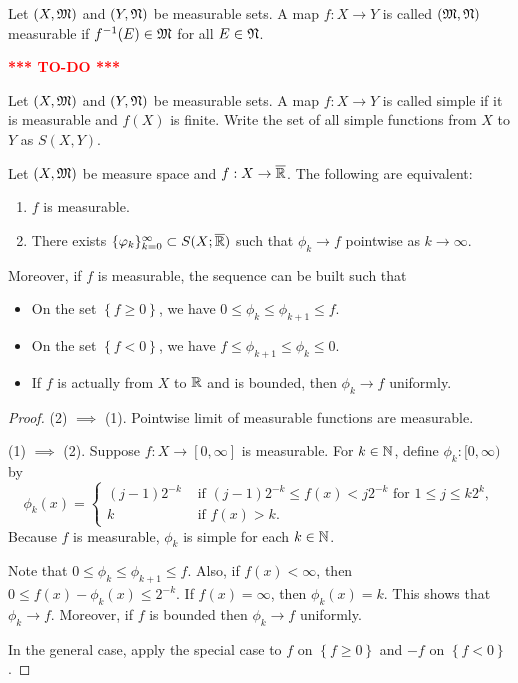 \documentclass[a4paper]{article}
\newcommand{\TODO}{\textcolor{red}{\textbf{*** TO-DO ***}}}
\begin{document}
\begin{defi}
  Let $(X, \mathfrak{M})$ and $(Y, \mathfrak{N})$ be measurable sets. A map 
  $f : X \to Y$ is called $(\mathfrak{M}, \mathfrak{N})$ measurable if $f^{-1}(E) 
  \in \mathfrak{M}$ for all $E \in \mathfrak{N}$.
\end{defi}

\TODO

\begin{defi}
  Let $(X, \mathfrak{M})$ and $(Y, \mathfrak{N})$ be measurable sets. A map 
  $f : X \to Y$ is called simple if it is 
  measurable and $f(X)$ is finite. Write the set of all 
  simple functions from $X$ to $Y$ as 
  $S(X, Y)$.
\end{defi}

\begin{thm}
  Let $(X, \mathfrak{M})$ be measure space and $f : X \to \overline{\mathbb{R}}$. The 
  following are equivalent: 
  \begin{enumerate}
    \item $f$ is measurable. 
    \item There exists $\{ \varphi_k \}_{k=0}^\infty \subset S(X; \overline{\mathbb{R}})$ such that 
    $\phi_k \to f$ pointwise as $k \to \infty$.
  \end{enumerate}
  Moreover, if $f$ is measurable, the sequence can be built such that 
  \begin{itemize}
    \item On the set $\left\{ f \geq 0 \right\}$, we have 
    $0 \leq \phi_k \leq \phi_{k+1} \leq f$.
    \item On the set $\left\{ f < 0 \right\}$, we have 
    $f \leq \phi_{k+1} \leq \phi_k \leq 0$.
    \item If $f$ is actually from $X$ to $\mathbb{R}$ and is bounded, 
    then $\phi_k \to f$ uniformly.
  \end{itemize}
\end{thm}

\begin{proof}
  (2) $\implies$ (1). Pointwise limit of measurable
  functions are measurable.

  (1) $\implies$ (2). Suppose $f : X \to [0, \infty]$
  is measurable. For $k \in \mathbb{N}$, define  
  $\phi_k : [0, \infty)$ by 
  \[
  \phi_k(x) = \begin{cases}
    (j - 1)2^{-k} & \text{ if 
    $(j - 1)2^{-k} \leq f(x) < j 2^{-k}$  
    for $1 \leq j \leq k 2^k$}, \\
    k & \text{ if $f(x) > k$}.
  \end{cases}
  \]
  Because $f$ is measurable, $\phi_k$ is simple for each 
  $k \in \mathbb{N}$. 

  Note that $0 \leq \phi_k \leq \phi_{k+1} \leq f$. Also, 
  if $f(x) < \infty$, then $0 \leq f(x) - \phi_k(x) \leq
  2^{-k}$. If $f(x) = \infty$, then $\phi_k(x) = k$.
  This shows that $\phi_k \to f$. Moreover, 
  if $f$ is bounded then $\phi_k \to f$ uniformly. 

  In the general case, apply the special case to $f$ on 
  $\left\{ f \geq 0 \right\}$ and $-f$ on 
  $\left\{ f < 0 \right\}$.

\end{proof}
\end{document}
